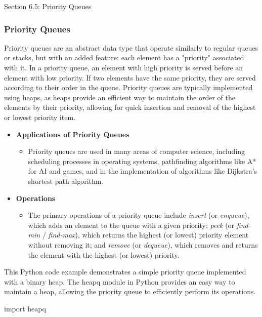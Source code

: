 \begin{notes}{Section 6.5: Priority Queues}
    \subsubsection*{Priority Queues}

    Priority queues are an abstract data type that operate similarly to regular queues or stacks, but with an added feature: each element has a "priority" associated with it. In a priority queue, an 
    element with high priority is served before an element with low priority. If two elements have the same priority, they are served according to their order in the queue. Priority queues are typically 
    implemented using heaps, as heaps provide an efficient way to maintain the order of the elements by their priority, allowing for quick insertion and removal of the highest or lowest priority item.
    
    \begin{itemize}
        \item \textbf{Applications of Priority Queues}
        \begin{itemize}
            \item Priority queues are used in many areas of computer science, including scheduling processes in operating systems, pathfinding algorithms like A* for AI and games, and in the 
            implementation of algorithms like Dijkstra's shortest path algorithm.
        \end{itemize}
        
        \item \textbf{Operations}
        \begin{itemize}
            \item The primary operations of a priority queue include \emph{insert} (or \emph{enqueue}), which adds an element to the queue with a given priority; \emph{peek} (or \emph{find-min} / \emph{find-max}), 
            which returns the highest (or lowest) priority element without removing it; and \emph{remove} (or \emph{dequeue}), which removes and returns the element with the highest (or lowest) priority.
        \end{itemize}
    \end{itemize}
    
    \begin{highlight}
        This Python code example demonstrates a simple priority queue implemented with a binary heap. The heapq module in Python provides an easy way to maintain a heap, allowing the priority queue to 
        efficiently perform its operations.
    \begin{code}[Python]
    import heapq
    

\end{code}
\end{highlight}
\end{notes}
